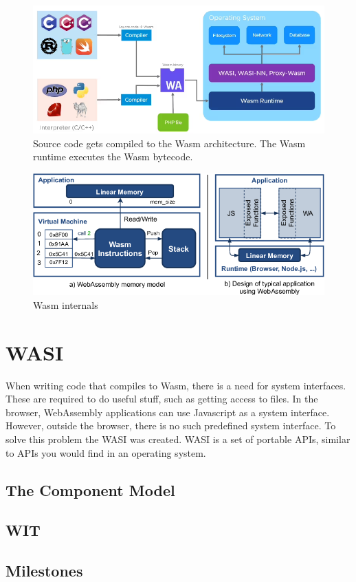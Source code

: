 \begin{figure}[h]
  \centering
  \includegraphics[width=1\textwidth]{images/wasm_compiler.png}
  \caption{Source code gets compiled to the Wasm architecture. The Wasm runtime executes the Wasm bytecode. \cite{docker_without_containers}}
  \label{fig:wasm_compiler_frontend}
\end{figure}

\begin{figure}[h]
  \centering
  \includegraphics[width=1\textwidth]{images/WebAssembly-high-level-architecture.png}
  \caption{Wasm internals \cite{wasm_vulnerabilities}}
  \label{fig:wasm_high_level}
\end{figure}

\section{\acrshort{WASI}}

When writing code that compiles to Wasm, there is a need for system interfaces. These are required to do useful stuff, such as getting access to files. In the browser, WebAssembly applications can use Javascript as a system interface. However, outside the browser, there is no such predefined system interface. To solve this problem the \acrfull{WASI} was created. \acrshort{WASI} is a set of portable APIs, similar to APIs you would find in an operating system.

\subsection{The Component Model}

\subsection{\acrshort{WIT}}

\subsection{Milestones}

